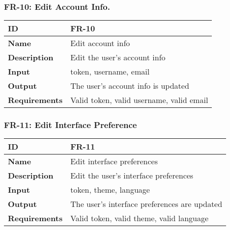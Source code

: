 \subsubsection{FR-10: Edit Account Info.}
\begin{center}
  \begin{tabularx}{\textwidth}{|l|X|}
      \hline
      \textbf{ID} & FR-10 \\
      \hline
      \textbf{Name} & Edit account info \\
      \hline
      \textbf{Description} & Edit the user's account info \\
      \hline
      \textbf{Input} & token, username, email \\
      \hline
      \textbf{Output} & The user's account info is updated \\
      \hline
      \textbf{Requirements} & Valid token, valid username, valid email \\
      \hline
  \end{tabularx}
\end{center}

\subsubsection{FR-11: Edit Interface Preference}
\begin{center}
  \begin{tabularx}{\textwidth}{|l|X|}
      \hline
      \textbf{ID} & FR-11 \\
      \hline
      \textbf{Name} & Edit interface preferences \\
      \hline
      \textbf{Description} & Edit the user's interface preferences \\
      \hline
      \textbf{Input} & token, theme, language \\
      \hline
      \textbf{Output} & The user's interface preferences are updated \\
      \hline
      \textbf{Requirements} & Valid token, valid theme, valid language \\
      \hline
  \end{tabularx}
\end{center}

